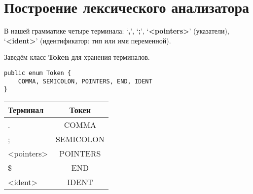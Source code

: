 \section{Построение лексического анализатора}

В нашей грамматике четыре терминала:
    ‘\textbf{,}’,
    ‘\textbf{;}’,
    ‘\textbf{<pointers>}’ (указатели),
    ‘\textbf{<ident>}’ (идентификатор: тип или имя переменной).

Заведём класс \textbf{Token} для хранения терминалов.

\begin{lstlisting}
public enum Token {
    COMMA, SEMICOLON, POINTERS, END, IDENT
}
\end{lstlisting}

\begin{tabular}{| l | c |}
    \hline
    \textbf{Терминал} & \textbf{Токен} \\
    \hline
    . & COMMA \\
    \hline
    ; & SEMICOLON \\
    \hline
    <pointers> & POINTERS \\
    \hline
    \$ & END \\
    \hline
    <ident> & IDENT \\
    \hline
\end{tabular}

